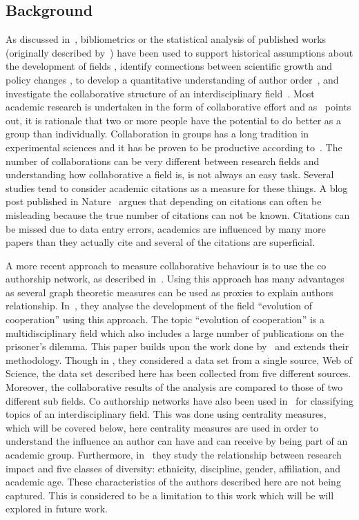\documentclass{article}
\theoremstyle{definition}
\begin{document}
\subsection{Background}\label{section:background}

As discussed in~\cite{youngblood2018}, bibliometrics or the statistical analysis
of published works (originally described by~\cite{pritchard1969}) 
have been used to support historical assumptions about the development of fields
\cite{raina1998}, identify connections between scientific growth and policy changes 
\cite{das2016}, to develop a quantitative understanding of author order~\cite{sekara2018},
and investigate the collaborative structure of an interdisciplinary field~\cite{Liu2015}.
Most academic research is undertaken in the form of collaborative effort and as~\cite{Kyvik2017}
points out, it is rationale that two or more people have the potential to do better
as a group than individually. Collaboration in groups has a long tradition in experimental 
sciences and it has be proven to be productive according to~\cite{Etzkowitz1992}.
The number of collaborations can be very different between research fields and
understanding how collaborative a field is, is not always an easy task.
Several studies tend to consider academic citations as a measure for these things.
A blog post published in Nature~\cite{nature_blog} argues that depending on citations
can often be misleading because the true number of citations can not be
known. Citations can be missed due to data entry errors, academics are influenced
by many more papers than they actually cite and several of the citations are
superficial.

A more recent approach to measure collaborative behaviour is to use the co
authorship network, as described in~\cite{Liu2015}. Using this approach has many
advantages as several graph theoretic measures can be used as proxies to explain
authors relationship. In~\cite{Liu2015}, they analyse the development of the field
``evolution of cooperation'' using this approach. The topic ``evolution of cooperation''
is a multidisciplinary field which also includes a large number of publications
on the prisoner's dilemma. This paper builds upon the work done by~\cite{Liu2015}
and extends their methodology. Though in
\cite{Liu2015}, they considered a data set from a single source, Web of Science,
the data set described here has been collected from five different sources. Moreover, the collaborative
results of the analysis are compared to those of two different sub fields.
Co authorship networks have also been used in~\cite{youngblood2018} for classifying
topics of an interdisciplinary field. This was done using centrality measures,
which will be covered below, here centrality measures are used in order to understand
the influence an author can have and can receive by being part of an academic group.
Furthermore, in~\cite{alshebli2018} they study the relationship between research
impact and five classes of diversity: ethnicity, discipline, gender, affiliation,
and academic age. These characteristics of the authors described here are not
being captured. This is considered to be a limitation to this work which will
be will explored in future work.
\end{document}
